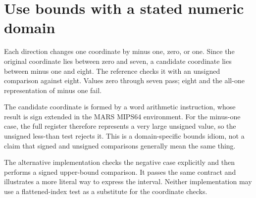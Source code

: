 \section{Use bounds with a stated numeric domain}\label{maze-p06}

Each direction changes one coordinate by minus one, zero, or one. Since the original coordinate lies between zero and seven, a candidate coordinate lies between minus one and eight. The reference checks it with an unsigned comparison against eight. Values zero through seven pass; eight and the all-one representation of minus one fail.

The candidate coordinate is formed by a word arithmetic instruction, whose result is sign extended in the MARS MIPS64 environment. For the minus-one case, the full register therefore represents a very large unsigned value, so the unsigned less-than test rejects it. This is a domain-specific bounds idiom, not a claim that signed and unsigned comparisons generally mean the same thing.

The alternative implementation checks the negative case explicitly and then performs a signed upper-bound comparison. It passes the same contract and illustrates a more literal way to express the interval. Neither implementation may use a flattened-index test as a substitute for the coordinate checks.
